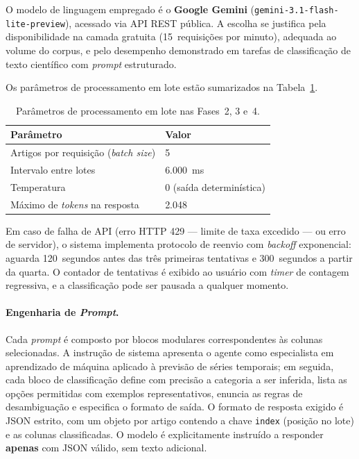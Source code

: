 O modelo de linguagem empregado é o \textbf{Google Gemini}
(\texttt{gemini-3.1-flash-lite-preview}), acessado via API REST
pública. A escolha se justifica pela disponibilidade na camada
gratuita (15~requisições por minuto), adequada ao volume do corpus,
e pelo desempenho demonstrado em tarefas de classificação de texto
científico com \textit{prompt} estruturado.

Os parâmetros de processamento em lote estão sumarizados na
Tabela~\ref{tab:batch-params}.

\begin{table}[htbp]
\centering
\caption{Parâmetros de processamento em lote nas Fases~2, 3 e~4.}
\label{tab:batch-params}
\begin{tabular}{ll}
\toprule
\textbf{Parâmetro} & \textbf{Valor} \\
\midrule
Artigos por requisição (\textit{batch size}) & 5 \\
Intervalo entre lotes                        & 6.000~ms \\
Temperatura                                  & 0 (saída determinística) \\
Máximo de \textit{tokens} na resposta        & 2.048 \\
\bottomrule
\end{tabular}
\end{table}

Em caso de falha de API (erro HTTP 429 — limite de taxa excedido —
ou erro de servidor), o sistema implementa protocolo de reenvio com
\textit{backoff} exponencial: aguarda 120~segundos antes das três
primeiras tentativas e 300~segundos a partir da quarta. O contador
de tentativas é exibido ao usuário com \textit{timer} de contagem
regressiva, e a classificação pode ser pausada a qualquer momento.

\paragraph{Engenharia de \textit{Prompt}.}

Cada \textit{prompt} é composto por blocos modulares correspondentes
às colunas selecionadas. A instrução de sistema apresenta o agente
como especialista em aprendizado de máquina aplicado à previsão de
séries temporais; em seguida, cada bloco de classificação define com
precisão a categoria a ser inferida, lista as opções permitidas com
exemplos representativos, enuncia as regras de desambiguação e
especifica o formato de saída. O formato de resposta exigido é JSON
estrito, com um objeto por artigo contendo a chave \texttt{index}
(posição no lote) e as colunas classificadas. O modelo é
explicitamente instruído a responder \textbf{apenas} com JSON
válido, sem texto adicional.

